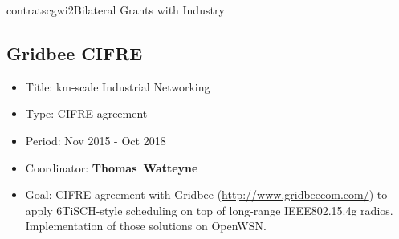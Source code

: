 \documentclass{ra2016}
\newcommand{\thomas}  {\textbf{Thomas~Watteyne}}
\begin{document}
\begin{module}{contrats}{cgwi2}{Bilateral Grants with Industry}

\subsection{Gridbee CIFRE}

\begin{participants}
\end{participants}

\begin{itemize}
    \item Title: km-scale Industrial Networking
    \item Type: CIFRE agreement
    \item Period: Nov 2015 - Oct 2018
    \item Coordinator: \thomas
    \item Goal: CIFRE agreement with Gridbee (\url{http://www.gridbeecom.com/}) to apply 6TiSCH-style scheduling on top of long-range IEEE802.15.4g radios. Implementation of those solutions on OpenWSN.
\end{itemize}



\end{module}



\end{document}
